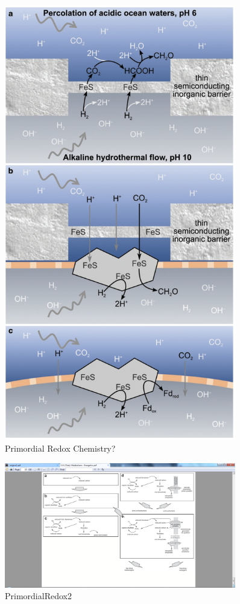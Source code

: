 \documentclass[]{article}
\begin{document}
\begin{figure}[H]
	\caption{Primordial Redox Chemistry?} \label{fig:PrimordialRedox} 
	\includegraphics[width=0.9\textwidth]{PrimordialRedox}
\end{figure}

\begin{figure}[H]
	\caption{PrimordialRedox2} \label{fig:PrimordialRedox2} 
	\includegraphics[width=0.9\textwidth]{PrimordialRedox2}
\end{figure}
\end{document}

